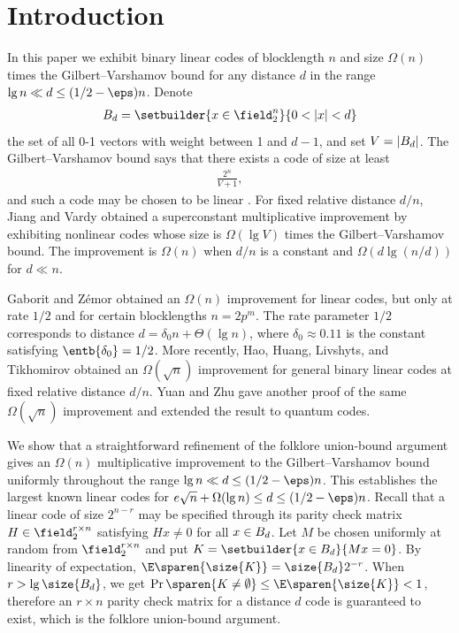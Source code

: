 \section{Introduction}
\label{sec:intro}
In this paper we exhibit binary linear codes of blocklength
$n$ and size $\Omega(n)$ times the Gilbert--Varshamov
bound for any distance $d$ in the range
$\lg n\ll d\le(1/2-\eps)n$. Denote
\begin{align*}
  \ball=\setbuilder{x\in\field_2^n}{0<|x|<d}
\end{align*}
the set of all 0-1 vectors with weight between 1 and $d-1$,
and set $V=|B_d|$. The Gilbert--Varshamov bound
\cite{Gilbert1952, Varshamov1957} says that there exists a
code of size at least
\begin{align*}
  \frac{2^n}{V+1},
\end{align*}
and such a code may be chosen to be linear
\cite{Varshamov1957}. For fixed relative distance $d/n$,
Jiang and Vardy \cite{JiangV2004} obtained a superconstant
multiplicative improvement by exhibiting nonlinear codes
whose size is $\Omega(\lg V)$
times the Gilbert--Varshamov bound. The improvement is
$\Omega(n)$ when $d/n$ is a constant and $\Omega(d\lg(n/d))$
for $d\ll n$.

Gaborit and Zémor \cite{GaboritZ2008} obtained an
$\Omega(n)$ improvement for linear codes, but only at rate
$1/2$ and for certain blocklengths $n=2p^m$. The rate
parameter $1/2$ corresponds to distance
$d=\delta_0n+\Theta(\lg n)$, where $\delta_0\approx0.11$ is
the constant satisfying $\entb{\delta_0}=1/2$. More
recently, Hao, Huang, Livshyts, and Tikhomirov
\cite{HaoHLT2022} obtained an $\Omega(\sqrt n)$ improvement
for general binary linear codes at fixed relative distance
$d/n$. Yuan and Zhu \cite{YuanZ2026} gave another proof of
the same $\Omega(\sqrt n)$ improvement and extended the
result to quantum codes.
%

%

We show that a straightforward refinement of the folklore
union-bound argument gives an $\Omega(n)$ multiplicative
improvement to the Gilbert--Varshamov bound uniformly
throughout the range $\lg n\ll d\le(1/2-\eps)n$. This
establishes the largest known linear codes for
$e \sqrt{n} + \Omega(\lg n)\le d \le (1/2-\eps)n$.
%
Recall that a linear code of size $2^{n-r}$ may be specified
through its parity check matrix $H\in\field_2^{r\times n}$
satisfying $Hx \ne 0$ for all $x\in B_d$. Let $M$ be
chosen uniformly at random from $\field_2^{r\times n}$ and
put $\kero=\setbuilder{x\in \ball}{Mx = 0}$. By linearity of
expectation,
%
$\E\sparen{\size{\kero}}=\size{\ball}2^{-r}$.
%
When $r>\lg\size{\ball}$, we get
$\Pr\sparen{\kero\neq\emptyset} \le \E\sparen{\size{\kero}}<
1$, therefore an $r\times n$ parity check matrix for a
distance $d$ code is guaranteed to exist, which is the
folklore union-bound argument.

